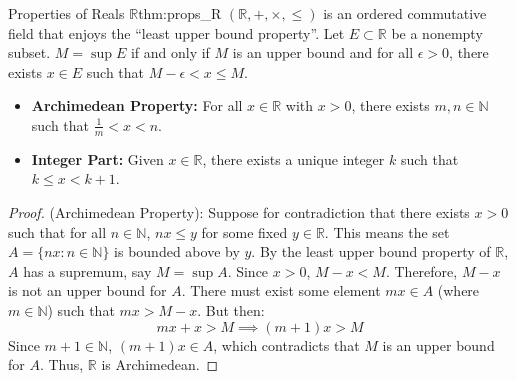 \documentclass[11pt, a4paper]{article}
\begin{document}
\begin{theorem}{Properties of Reals $\mathbb{R}$}{thm:props_R}
$(\mathbb{R}, +, \times, \le)$ is an ordered commutative field that enjoys the ``least upper bound property''. Let $E \subset \mathbb{R}$ be a nonempty subset. $M = \sup E$ if and only if $M$ is an upper bound and for all $\epsilon > 0$, there exists $x \in E$ such that $M - \epsilon < x \le M$.
\begin{itemize}
    \item \textbf{Archimedean Property:} For all $x \in \mathbb{R}$ with $x > 0$, there exists $m, n \in \mathbb{N}$ such that $\frac{1}{m} < x < n$.
    \item \textbf{Integer Part:} Given $x \in \mathbb{R}$, there exists a unique integer $k$ such that $k \le x < k+1$.
\end{itemize}
\end{theorem}
\begin{proof}
(Archimedean Property): Suppose for contradiction that there exists $x > 0$ such that for all $n \in \mathbb{N}$, $nx \le y$ for some fixed $y \in \mathbb{R}$.
This means the set $A = \{nx : n \in \mathbb{N}\}$ is bounded above by $y$.
By the least upper bound property of $\mathbb{R}$, $A$ has a supremum, say $M = \sup A$.
Since $x > 0$, $M - x < M$. Therefore, $M - x$ is not an upper bound for $A$.
There must exist some element $mx \in A$ (where $m \in \mathbb{N}$) such that $mx > M - x$.
But then:
$$ mx + x > M \implies (m+1)x > M $$
Since $m+1 \in \mathbb{N}$, $(m+1)x \in A$, which contradicts that $M$ is an upper bound for $A$. Thus, $\mathbb{R}$ is Archimedean.
\end{proof}
\end{document}
